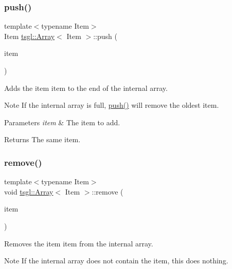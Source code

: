 \subsubsection{\texorpdfstring{push()}{push()}}
{\footnotesize\ttfamily template$<$typename Item$>$ \\
Item \hyperlink{classtsgl_1_1_array}{tsgl\+::\+Array}$<$ Item $>$\+::push (\begin{DoxyParamCaption}\item[{Item}]{item }\end{DoxyParamCaption})\hspace{0.3cm}{\ttfamily [inline]}}



Adds the item {\ttfamily item} to the end of the internal array. 

\begin{DoxyNote}{Note}
If the internal array is full, \hyperlink{classtsgl_1_1_array_aca25dfa4218b2c872d1e1cd2a1a32caa}{push()} will remove the oldest item. 
\end{DoxyNote}

\begin{DoxyParams}{Parameters}
{\em item} & The item to add. \\
\hline
\end{DoxyParams}
\begin{DoxyReturn}{Returns}
The same item. 
\end{DoxyReturn}
\mbox{\label{classtsgl_1_1_array_aa6b198643094a1b567f8f8bda76dcc53}} 
\subsubsection{\texorpdfstring{remove()}{remove()}}
{\footnotesize\ttfamily template$<$typename Item$>$ \\
void \hyperlink{classtsgl_1_1_array}{tsgl\+::\+Array}$<$ Item $>$\+::remove (\begin{DoxyParamCaption}\item[{Item}]{item }\end{DoxyParamCaption})\hspace{0.3cm}{\ttfamily [inline]}}



Removes the item {\ttfamily item} from the internal array. 

\begin{DoxyNote}{Note}
If the internal array does not contain the item, this does nothing. 
\end{DoxyNote}

